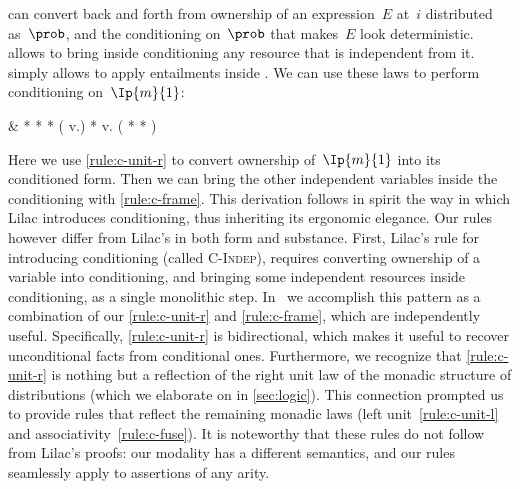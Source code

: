  can convert back and forth from
ownership of an expression~$E$ at~$i$ distributed as~$\prob$,
and the conditioning on~$\prob$ that makes~$E$ look deterministic.
 allows to bring inside conditioning
any resource that is independent from it.
 simply allows to apply entailments inside \supercond.
We can use these laws to perform conditioning on~$\Ip{m}{1}$:
\begin{eqexplain}
&
  *
  *
\whichproves
  *
  ( v.)
  *
\whichproves
   v.
  \left(
    *
    *
  \right)
\end{eqexplain}
Here we use \ref{rule:c-unit-r} to convert ownership of~$\Ip{m}{1}$
into its conditioned form.
Then we can bring the other independent variables inside the conditioning
with \ref{rule:c-frame}.
This derivation follows in spirit the way in which Lilac
introduces conditioning, thus inheriting its ergonomic elegance.
Our rules however differ from Lilac's in both form and substance.
First, Lilac's rule for introducing conditioning (called \textsc{C-Indep}),
requires converting ownership of a variable into conditioning, and bringing some independent resources inside conditioning, as a single monolithic step.
In \thelogic\ we accomplish this pattern as a combination of our
\ref{rule:c-unit-r} and \ref{rule:c-frame},
which are independently useful.
Specifically, \ref{rule:c-unit-r} is bidirectional,
which makes it useful to recover unconditional facts from conditional ones.
Furthermore, we recognize that \ref{rule:c-unit-r} is nothing but
a reflection of the right unit law of the monadic structure of distributions
(which we elaborate on in \cref{sec:logic}).
This connection prompted us to provide rules that reflect the remaining
monadic laws (left unit~\ref{rule:c-unit-l} and
associativity~\ref{rule:c-fuse}). It is noteworthy that these rules do not follow from Lilac's proofs:
our modality has a different semantics, and our rules seamlessly apply to
assertions of any arity.

